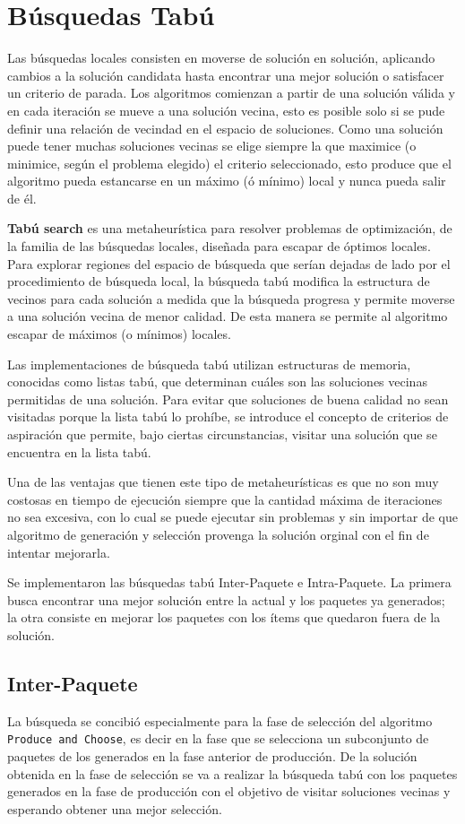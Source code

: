\section{Búsquedas Tabú}
Las búsquedas locales consisten en moverse de solución en solución, aplicando cambios a la solución candidata hasta encontrar una mejor solución o satisfacer un criterio de parada. Los algoritmos comienzan a partir de una solución válida y en cada iteración se mueve a una solución vecina, esto es posible solo si se pude definir una relación de vecindad en el espacio de soluciones. Como una solución puede tener muchas soluciones vecinas se elige siempre la que maximice (o minimice, según el problema elegido) el criterio seleccionado, esto produce que el algoritmo pueda estancarse en un máximo (ó mínimo) local y nunca pueda salir de él.

\textbf{Tabú search} es una metaheurística para resolver problemas de optimización, de la familia de las búsquedas locales, diseñada para escapar de óptimos locales. Para explorar regiones del espacio de búsqueda que serían dejadas de lado por el procedimiento de búsqueda local, la búsqueda tabú modifica la estructura de vecinos para cada solución a medida que la búsqueda progresa y permite moverse a una solución vecina de menor calidad. De esta manera se permite al algoritmo escapar de máximos (o mínimos) locales.

Las implementaciones de búsqueda tabú utilizan estructuras de memoria, conocidas como listas tabú, que determinan cuáles son las soluciones vecinas permitidas de una solución. Para evitar que soluciones de buena calidad no sean visitadas porque la lista tabú lo prohíbe, se introduce el concepto de criterios de aspiración que permite, bajo ciertas circunstancias, visitar una solución que se encuentra en la lista tabú.

Una de las ventajas que tienen este tipo de metaheurísticas es que no son muy costosas en tiempo de ejecución siempre que la cantidad máxima de iteraciones no sea excesiva, con lo cual se puede ejecutar sin problemas y sin importar de que algoritmo de generación y selección provenga la solución orginal con el fin de intentar mejorarla.

Se implementaron las búsquedas tabú Inter-Paquete e Intra-Paquete. La primera busca encontrar una mejor solución entre la actual y los paquetes ya generados; la otra consiste en mejorar los paquetes con los ítems que quedaron fuera de la solución.

\subsection{Inter-Paquete}
La búsqueda se concibió especialmente para la fase de selección del algoritmo \texttt{Produce and Choose}, es decir en la fase que se selecciona un subconjunto de paquetes de los generados en la fase anterior de producción. De la solución obtenida en la fase de selección se va a realizar la búsqueda tabú con los paquetes generados en la fase de producción con el objetivo de visitar soluciones vecinas y esperando obtener una mejor selección.

